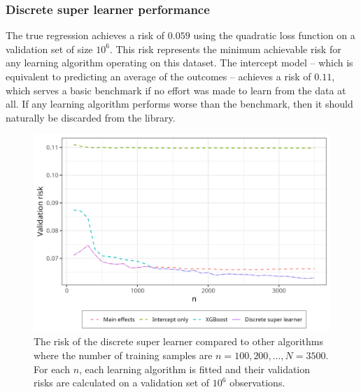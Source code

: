 \documentclass[./main.tex]{subfiles}
\begin{document}
\subsubsection{Discrete super learner performance}
The true regression achieves a risk of $ 0.059 $ using the quadratic loss function on a validation set of size $ 10^{6} $. This risk represents the minimum achievable risk for any learning algorithm operating on this dataset. The intercept model -- which is equivalent to predicting an average of the outcomes -- achieves a risk of $ 0.11 $, which serves a basic benchmark if no effort was made to learn from the data at all. If any learning algorithm performs worse than the benchmark, then it should naturally be discarded from the library.  
\begin{figure}[H]
    \centering
    \includegraphics[width=\textwidth]{figures/dsl_loss.png}
    \caption{The risk of the discrete super learner compared to other algorithms where the number of training samples are $n = 100, 200, \dots , N = 3500 $. For each $ n $, each learning algorithm is fitted and their validation risks are calculated on a validation set of $ 10^{6} $ observations.} 
    \label{fig:loss_min_of_both}
\end{figure}
\end{document}
